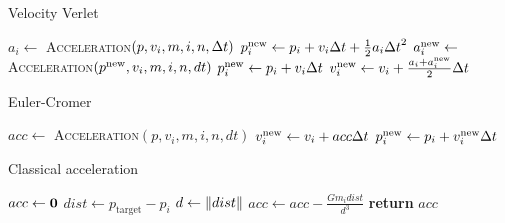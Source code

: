\documentclass[a4paper]{article}
\begin{document}
\begin{algorithm}
\caption{Velocity Verlet} \label{alg:velocity_verlet}
\begin{algorithmic}[1]
        \State $a_{i} \gets $ \textsc{Acceleration}$(p, v_{i}, m, i, n, {\Delta t})$
        \State $p^{\mathrm{new}}_{i} \gets p_{i} + v_{i} {\Delta t} + \frac{1}{2} a_{i} {\Delta t}^2$
    \EndFor
        \State $a^{\mathrm{new}}_{i} \gets $ \textsc{Acceleration}$(p^{\mathrm{new}}, v_{i}, m, i, n, dt)$
        \State $p^{\mathrm{new}}_{i} \gets p_{i} + v_{i} {\Delta t}$
        \State $v^{\mathrm{new}}_{i} \gets v_{i} + \frac{a_{i} + a^{\mathrm{new}}_{i}}{2} {\Delta t}$
    \EndFor
  \EndProcedure
\end{algorithmic}
\end{algorithm}

\begin{algorithm}
\caption{Euler-Cromer} \label{alg:euler_cromer}
\begin{algorithmic}[1]
        \State $acc \gets $ \textsc{Acceleration}$(p, v_{i}, m, i, n, dt)$
        \State $v^{\mathrm{new}}_{i} \gets v_{i} + acc {\Delta t}$
        \State $p^{\mathrm{new}}_{i} \gets p_{i} + v^{\mathrm{new}}_{i} {\Delta t}$
    \EndFor
  \EndProcedure
\end{algorithmic}
\end{algorithm}

\begin{algorithm}
\caption{Classical acceleration} \label{alg:acceleration_classical}
\begin{algorithmic}[1]
    \Statex {}
    \State $acc \gets \bf{0}$ 
            \State $dist \gets p_{\mathrm{target}} - p_{i}$
            \State $d \gets \norm{dist}$ 
            \State $acc \gets acc - \frac{G m_{i} dist}{d^3}$
        \EndIf
    \EndFor
    \State \textbf{return} $acc$
  \EndFunction
\end{algorithmic}
\end{algorithm}
\end{document}
